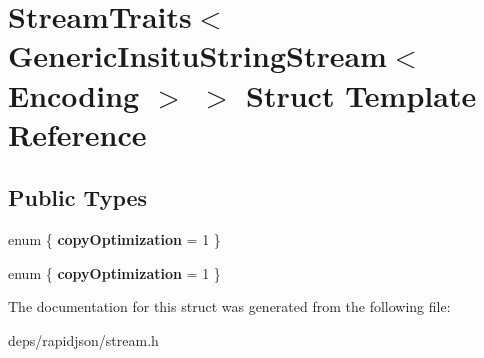 \hypertarget{struct_stream_traits_3_01_generic_insitu_string_stream_3_01_encoding_01_4_01_4}{}\section{Stream\+Traits$<$ Generic\+Insitu\+String\+Stream$<$ Encoding $>$ $>$ Struct Template Reference}
\label{struct_stream_traits_3_01_generic_insitu_string_stream_3_01_encoding_01_4_01_4}
\subsection*{Public Types}
\begin{DoxyCompactItemize}
\item 
enum \{ {\bfseries copy\+Optimization} = 1
 \}\hypertarget{struct_stream_traits_3_01_generic_insitu_string_stream_3_01_encoding_01_4_01_4_a8cf1925a04aba7bd4dafb2fa6e73cc98}{}\label{struct_stream_traits_3_01_generic_insitu_string_stream_3_01_encoding_01_4_01_4_a8cf1925a04aba7bd4dafb2fa6e73cc98}

\item 
enum \{ {\bfseries copy\+Optimization} = 1
 \}\hypertarget{struct_stream_traits_3_01_generic_insitu_string_stream_3_01_encoding_01_4_01_4_a4dd05fb1cf3d01f55c02332d1e58f144}{}\label{struct_stream_traits_3_01_generic_insitu_string_stream_3_01_encoding_01_4_01_4_a4dd05fb1cf3d01f55c02332d1e58f144}

\end{DoxyCompactItemize}


The documentation for this struct was generated from the following file\+:\begin{DoxyCompactItemize}
\item 
deps/rapidjson/stream.\+h\end{DoxyCompactItemize}
